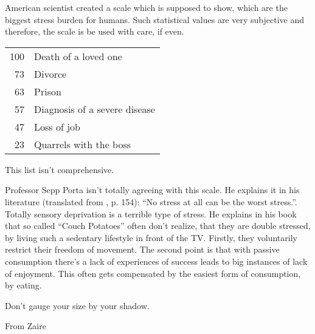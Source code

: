 \documentclass[../main.tex]{subfiles}
\begin{document}
American scientist created a scale which is supposed to show, which are the biggest stress burden for humans.
Such statistical values are very subjective and therefore, the scale is be used with care, if even.

\begin{center}
  \begin{tabular}{r l}
    100 & Death of a loved one \\
    73 & Divorce \\
    63 & Prison \\
    57 & Diagnosis of a severe disease \\
    47 & Loss of job \\
    23 & Quarrels with the boss
  \end{tabular}
\end{center}

This list isn't comprehensive.

Professor Sepp Porta isn't totally agreeing with this scale. He explains it in his literature (translated from \cite{PortaStress}, p. 154): ``No stress at all can be the worst stress.''. Totally sensory deprivation is a terrible type of stress.
He explains in his book that so called ``Couch Potatoes'' often don't realize, that they are double stressed, by living such a sedentary lifestyle in front of the TV. Firstly, they voluntarily restrict their freedom of movement. The second point is that with passive consumption there's a lack of experiences of success leads to big instances of lack of enjoyment.
This often gets compensated by the easiest form of consumption, by eating.

\epigraph{Don't gauge your size by your shadow.}{From Zaire}
\end{document}
